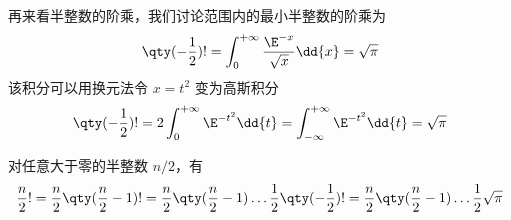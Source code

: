 再来看半整数的阶乘，我们讨论范围内的最小半整数的阶乘为 
\begin{equation}
\qty(-\frac12) ! = \int_0^{+\infty} \frac{\E^{-x}}{\sqrt x}\dd{x} = \sqrt{\pi}
\end{equation}
该积分可以用换元法令 $x = t^2$ 变为高斯积分
\begin{equation}
\qty(-\frac 12)! = 2\int_0^{+\infty} \E^{-t^2} \dd{t} = \int_{-\infty}^{+\infty} \E^{-t^2} \dd{t} = \sqrt{\pi}
\end{equation}

对任意大于零的半整数 $n/2$，有
\begin{equation}
\frac{n}{2}! = \frac{n}{2} \qty(\frac{n}{2}-1)! = \frac{n}{2} \qty(\frac{n}{2}-1) \dots \frac12 \qty(-\frac12) ! = \frac{n}{2} \qty(\frac{n}{2}-1) \dots \frac12 \sqrt{\pi}
\end{equation}














